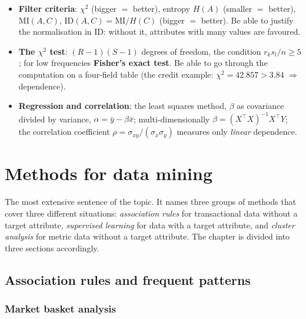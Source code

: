\documentclass[11pt,a4paper]{article}
\theoremstyle{definition}
\begin{document}
\begin{itemize}
      separately and is independent of the model (fast, but blind to interactions); a wrapper
      builds a model over a subset and evaluates it (expensive, takes interactions into account).
      Search \emph{bottom-up} (adding) or \emph{top-down} (removing).
\item \textbf{Filter criteria}: $\chi^2$ (bigger $=$ better), entropy $H(A)$ (smaller $=$
      better), $\mathrm{MI}(A,C)$, $\mathrm{ID}(A,C)=\mathrm{MI}/H(C)$ (bigger $=$ better). Be
      able to justify the normalisation in $\mathrm{ID}$: without it, attributes with many
      values are favoured.
\item \textbf{The $\chi^2$ test}: $(R-1)(S-1)$ degrees of freedom, the condition
      $r_ks_l/n\ge 5$; for low frequencies \textbf{Fisher's exact test}. Be able to go through
      the computation on a four-field table (the credit example: $\chi^2=42.857>3.84$
      $\Rightarrow$ dependence).
\item \textbf{Regression and correlation}: the least squares method, $\beta$ as covariance
      divided by variance, $\alpha=\bar y-\beta\bar x$; multi-dimensionally
      $\beta=(X^{\!\top}\!X)^{-1}X^{\!\top}Y$; the correlation coefficient
      $\rho=\sigma_{xy}/(\sigma_x\sigma_y)$ measures only \emph{linear} dependence.
\end{itemize}

\newpage
\section{Methods for data mining}
\label{sec:metody}

The most extensive sentence of the topic. It names three groups of methods that cover three
different situations: \emph{association rules} for transactional data without a target attribute,
\emph{supervised learning} for data with a target attribute, and \emph{cluster analysis} for
metric data without a target attribute. The chapter is divided into three sections accordingly.

\subsection{Association rules and frequent patterns}
\label{ssec:ar}

\subsubsection{Market basket analysis}
\end{document}
